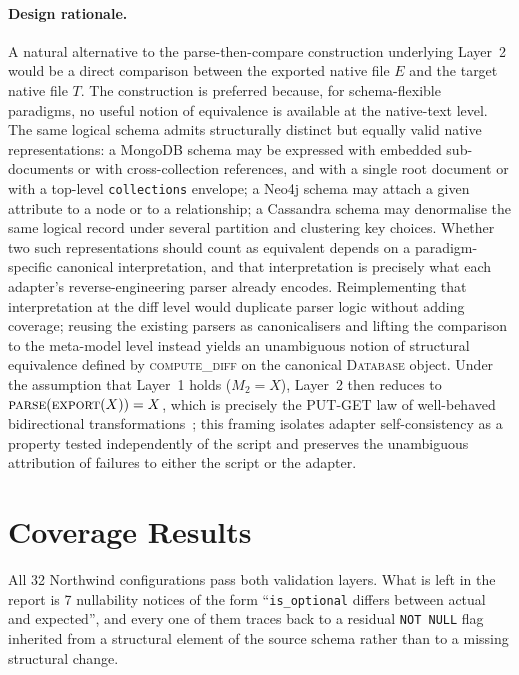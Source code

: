   \paragraph{Design rationale.}
  A natural alternative to the parse-then-compare construction
  underlying Layer~2 would be a direct comparison between the exported
  native file $E$ and the target native file $T$. The construction is
  preferred because, for schema-flexible paradigms, no useful notion
  of equivalence is available at the native-text level. The same
  logical schema admits structurally distinct but equally valid native
  representations: a MongoDB schema may be expressed with embedded
  sub-documents or with cross-collection references, and with a single
  root document or with a top-level \texttt{collections} envelope; a
  Neo4j schema may attach a given attribute to a node or to a
  relationship; a Cassandra schema may denormalise the same logical
  record under several partition and clustering key choices. Whether
  two such representations should count as equivalent depends on a
  paradigm-specific canonical interpretation, and that interpretation
  is precisely what each adapter's reverse-engineering parser already
  encodes. Reimplementing that interpretation at the diff level would
  duplicate parser logic without adding coverage; reusing the existing
  parsers as canonicalisers and lifting the comparison to the
  meta-model level instead yields an unambiguous notion of structural
  equivalence defined by \textsc{compute\_diff} on the canonical
  \textsc{Database} object. Under the assumption that Layer~1 holds
  ($M_2 = X$), Layer~2 then reduces to
  $\textsc{parse}(\textsc{export}(X)) = X$, which is precisely the
  PUT-GET law of well-behaved bidirectional
  transformations~\cite{foster2007combinators}; this framing isolates
  adapter self-consistency as a property tested independently of the
  script and preserves the unambiguous attribution of failures to
  either the script or the adapter.

  \section{Coverage Results}\label{sec:eval-coverage}

  All 32 Northwind configurations pass both validation layers. What is
  left in the report is 7 nullability notices of the form                                                                                                                 ``\texttt{is\_optional} differs between actual and expected'', and
  every one of them traces back to a residual \texttt{NOT NULL} flag
  inherited from a structural element of the source schema rather
  than to a missing structural change.

